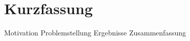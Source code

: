 
{%

\chapter*{Kurzfassung}
\vspace*{-1cm}

Motivation
Problemstellung
Ergebnisse
Zusammenfassung


}

